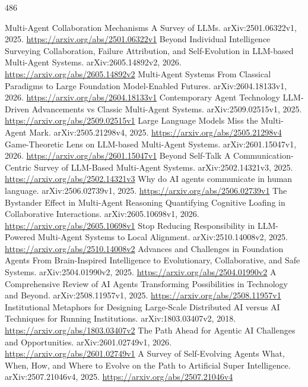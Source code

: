 \documentclass[11pt]{article}
\begin{document}
\begin{thebibliography}{486}
 Multi-Agent Collaboration Mechanisms A Survey of LLMs. arXiv:2501.06322v1, 2025. \url{https://arxiv.org/abs/2501.06322v1}
 Beyond Individual Intelligence Surveying Collaboration, Failure Attribution, and Self-Evolution in LLM-based Multi-Agent Systems. arXiv:2605.14892v2, 2026. \url{https://arxiv.org/abs/2605.14892v2}
 Multi-Agent Systems From Classical Paradigms to Large Foundation Model-Enabled Futures. arXiv:2604.18133v1, 2026. \url{https://arxiv.org/abs/2604.18133v1}
 Contemporary Agent Technology LLM-Driven Advancements vs Classic Multi-Agent Systems. arXiv:2509.02515v1, 2025. \url{https://arxiv.org/abs/2509.02515v1}
 Large Language Models Miss the Multi-Agent Mark. arXiv:2505.21298v4, 2025. \url{https://arxiv.org/abs/2505.21298v4}
 Game-Theoretic Lens on LLM-based Multi-Agent Systems. arXiv:2601.15047v1, 2026. \url{https://arxiv.org/abs/2601.15047v1}
 Beyond Self-Talk A Communication-Centric Survey of LLM-Based Multi-Agent Systems. arXiv:2502.14321v3, 2025. \url{https://arxiv.org/abs/2502.14321v3}
 Why do AI agents communicate in human language. arXiv:2506.02739v1, 2025. \url{https://arxiv.org/abs/2506.02739v1}
 The Bystander Effect in Multi-Agent Reasoning Quantifying Cognitive Loafing in Collaborative Interactions. arXiv:2605.10698v1, 2026. \url{https://arxiv.org/abs/2605.10698v1}
 Stop Reducing Responsibility in LLM-Powered Multi-Agent Systems to Local Alignment. arXiv:2510.14008v2, 2025. \url{https://arxiv.org/abs/2510.14008v2}
 Advances and Challenges in Foundation Agents From Brain-Inspired Intelligence to Evolutionary, Collaborative, and Safe Systems. arXiv:2504.01990v2, 2025. \url{https://arxiv.org/abs/2504.01990v2}
 A Comprehensive Review of AI Agents Transforming Possibilities in Technology and Beyond. arXiv:2508.11957v1, 2025. \url{https://arxiv.org/abs/2508.11957v1}
 Institutional Metaphors for Designing Large-Scale Distributed AI versus AI Techniques for Running Institutions. arXiv:1803.03407v2, 2018. \url{https://arxiv.org/abs/1803.03407v2}
 The Path Ahead for Agentic AI Challenges and Opportunities. arXiv:2601.02749v1, 2026. \url{https://arxiv.org/abs/2601.02749v1}
 A Survey of Self-Evolving Agents What, When, How, and Where to Evolve on the Path to Artificial Super Intelligence. arXiv:2507.21046v4, 2025. \url{https://arxiv.org/abs/2507.21046v4}

\end{thebibliography}
\end{document}
